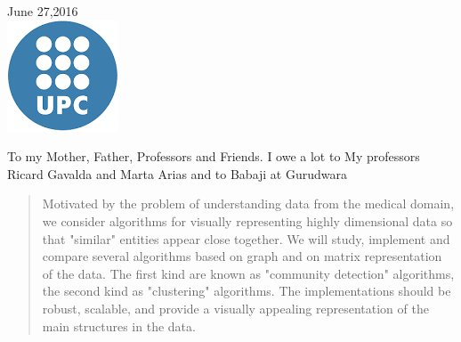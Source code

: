 \begin{titlepage}

\bigskip
\bigskip
{\large June 27,2016}\\[2cm] %


\includegraphics{logo.png}\\[1cm] %
 

\vfill %

\end{titlepage}

\newpage




\begin{dedication}
To my Mother, Father, Professors and Friends. I owe a lot to My professors Ricard Gavalda and Marta Arias and to Babaji at Gurudwara
\end{dedication}
\newpage
\clearpage
\newpage
\newpage

\begin{abstract}
Motivated by the problem of understanding data from
the medical domain, we consider algorithms for visually representing 
highly dimensional data so that "similar" entities appear close together. We will study, 
implement and compare several algorithms based on graph and on matrix
representation of the data. The first kind are known as "community detection"
algorithms, the second kind as "clustering" algorithms. The implementations
should be robust, scalable, and provide a visually appealing representation
of the main structures in the data.

\end{abstract}

